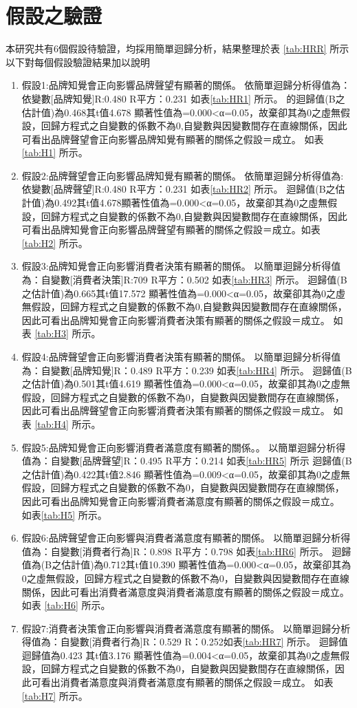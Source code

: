 \section{假設之驗證}
本研究共有6個假設待驗證，均採用簡單迴歸分析，結果整理於表 \ref{tab:HRR} 所示以下對每個假設驗證結果加以說明
\begin{enumerate}
\item 假設1:品牌知覺會正向影響品牌聲望有顯著的關係。
依簡單迴歸分析得值為：依變數[品牌知覺]R:0.480 R平方：0.231 如表\ref{tab:HR1}  所示。
的迴歸值(B之估計值)為0.468其t值4.678 顯著性值為=0.000<α=0.05，故棄卻其為0之虛無假設，回歸方程式之自變數的係數不為0,自變數與因變數間存在直線關係，因此可看出品牌聲望會正向影響品牌知覺有顯著的關係之假設＝成立。 如表\ref{tab:H1}  所示。
\item 假設2:品牌聲望會正向影響品牌知覺有顯著的關係。
依簡單迴歸分析得值為:依變數[品牌聲望]R:0.480 R平方：0.231 如表\ref{tab:HR2}  所示。
迴歸值(B之估計值)為0.492其t值4.678顯著性值為=0.000<α=0.05，故棄卻其為0之虛無假設，回歸方程式之自變數的係數不為0,自變數與因變數間存在直線關係，因此可看出品牌知覺會正向影響品牌聲望有顯著的關係之假設＝成立。如表\ref{tab:H2}  所示。
\item 假設3:品牌知覺會正向影響消費者決策有顯著的關係。
以簡單迴歸分析得值為：自變數[消費者決策]R:709 R平方：0.502 如表\ref{tab:HR3}  所示。
迴歸值(B之估計值)為0.665其t值17.572 顯著性值為=0.000<α=0.05，故棄卻其為0之虛無假設，回歸方程式之自變數的係數不為0,自變數與因變數間存在直線關係，因此可看出品牌知覺會正向影響消費者決策有顯著的關係之假設＝成立。 如表 \ref{tab:H3}  所示。
\item 假設4:品牌聲望會正向影響消費者決策有顯著的關係。
以簡單迴歸分析得值為：自變數[品牌知覺]R：0.489 R平方：0.239 如表\ref{tab:HR4}  所示。
迴歸值(B之估計值)為0.501其t值4.619 顯著性值為=0.000<α=0.05，故棄卻其為0之虛無假設，回歸方程式之自變數的係數不為0，自變數與因變數間存在直線關係，因此可看出品牌聲望會正向影響消費者決策有顯著的關係之假設＝成立。 如表 \ref{tab:H4}  所示。
\item 假設5:品牌知覺會正向影響消費者滿意度有顯著的關係。。
以簡單迴歸分析得值為：自變數[品牌聲望]R：0.495 R平方：0.214 如表\ref{tab:HR5}  所示
迴歸值(B之估計值)為0.422其t值2.846 顯著性值為=0.009<α=0.05，故棄卻其為0之虛無假設，回歸方程式之自變數的係數不為0，自變數與因變數間存在直線關係，因此可看出品牌知覺會正向影響消費者滿意度有顯著的關係之假設＝成立。 如表\ref{tab:H5}  所示。
\item 假設6:品牌聲望會正向影響與消費者滿意度有顯著的關係。
以簡單迴歸分析得值為：自變數[消費者行為]R：0.898 R平方：0.798 如表\ref{tab:HR6}  所示。
迴歸值為(B之估計值)為0.712其t值10.390 顯著性值為=0.000<α=0.05，故棄卻其為0之虛無假設，回歸方程式之自變數的係數不為0，自變數與因變數間存在直線關係，因此可看出消費者滿意度與消費者滿意度有顯著的關係之假設＝成立。 如表 \ref{tab:H6}  所示。
\item 假設7:消費者決策會正向影響與消費者滿意度有顯著的關係。
以簡單迴歸分析得值為：自變數[消費者行為]R：0.529 R：0.252如表\ref{tab:HR7}  所示。
迴歸值迴歸值為0.423 其t值3.176 顯著性值為=0.004<α=0.05，故棄卻其為0之虛無假設，回歸方程式之自變數的係數不為0，自變數與因變數間存在直線關係，因此可看出消費者滿意度與消費者滿意度有顯著的關係之假設＝成立。 如表 \ref{tab:H7}  所示。

\end{enumerate}


